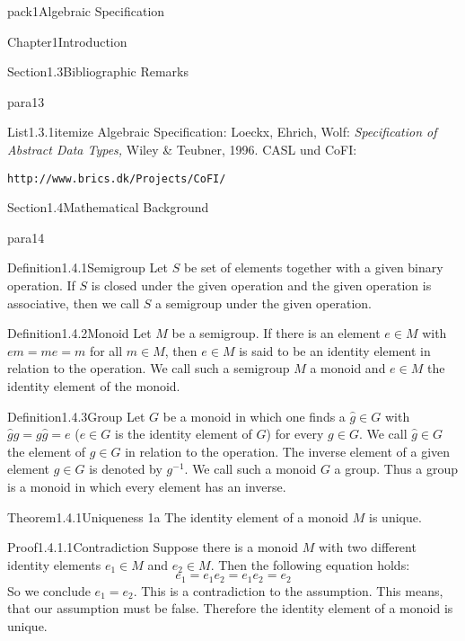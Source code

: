 \documentclass[landscape, slides, light]{mmiss2}
\begin{document}
\begin{Package}{pack1}{Algebraic
Specification}
\begin{Section}{Chapter1}{Introduction}
\begin{Section}{Section1.3}{Bibliographic Remarks}{}
\begin{Paragraph}{para13}{}{}
\begin{List}{List1.3.1}{itemize}{}
\ListItem{}
Algebraic Specification: Loeckx, Ehrich, Wolf: {\it
Specification of Abstract Data Types,} Wiley \& Teubner, 1996.
\ListItem{}
CASL und CoFI: 
\begin{verbatim}
http://www.brics.dk/Projects/CoFI/
\end{verbatim}
\end{List}
\end{Paragraph}

\end{Section}

\begin{Section}{Section1.4}{Mathematical Background}{}
\begin{Paragraph}{para14}{}{}
\begin{Definition}[Algebra]{Definition1.4.1}{Semigroup}{}
Let $S$ be  set of elements together with a given binary operation. If $S$
is closed under the given operation and the given operation is
associative, then we call $S$ a semigroup under the given operation.
\end{Definition}
\begin{Definition}[Algebra]{Definition1.4.2}{Monoid}{}
Let $M$ be a semigroup. If there is an element $e \in M$ with
$em=me=m$ for all $m \in M$, then $e \in M$ is said to be an identity
element in relation to the operation. We call such a semigroup $M$ a
monoid and $e \in M$ the identity element of the monoid.
\end{Definition}
\begin{Definition}[Algebra]{Definition1.4.3}{Group}{}
Let $G$ be a monoid in which one finds a $\hat{g} \in G$ with
$\hat{g}g=g\hat{g}=e$ ($e \in G$ is the identity element of $G$) for
every $g \in G$. We call $\hat{g} \in G$ the
 element of $g \in G$ in relation to
the operation. The inverse element of a given
element $g \in G$ is denoted by $g^{-1}$. We call such a monoid $G$ a
group. Thus a group is a monoid in which every element has an inverse.
\end{Definition}
\begin{Theorem}[Algebra]{Theorem1.4.1}{Uniqueness 1a}{}
The identity element of a monoid $M$ is unique.
\end{Theorem}

\begin{Proof}[Algebra]{Proof1.4.1.1}{Contradiction}{}
Suppose there is a monoid $M$ with two different identity elements $e_{1}
\in M$ and $e_{2} \in M$. Then the following equation holds:
\begin{displaymath}
e_{1}=e_{1}e_{2}=e_{1}e_{2}=e_{2}
\end{displaymath}
So we conclude $e_{1}=e_{2}$. This is a contradiction to the
assumption. This means, that our assumption must be false. Therefore
the identity element of a monoid is unique.
\end{Proof}


\end{Paragraph}
\end{Section}
\end{Section}
\end{Package}
\end{document}
